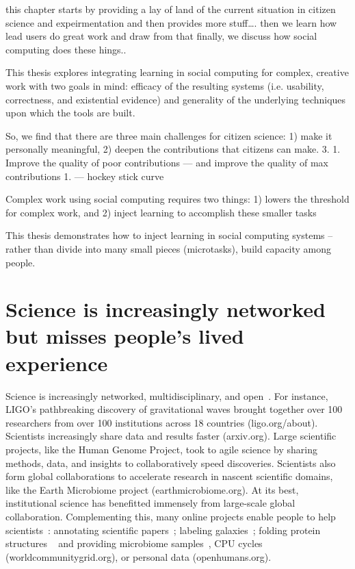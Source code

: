 this chapter starts by providing a lay of land of the current situation in citizen science and expeirmentation and then provides more stuff…. 
then we learn how lead users do great work and draw from that
finally, we discuss how social computing does these hings.. 

 This thesis explores integrating learning in social computing for complex, creative work with two goals in mind: efficacy of the resulting systems (i.e. usability, correctness, and existential evidence) and generality of the underlying techniques upon which the tools are built.

So, we find that there are three main challenges for citizen science: 1) make it personally meaningful, 2) deepen the contributions that citizens can make.
3. 1. Improve the quality of poor contributions — and improve the quality of max contributions 
    1. — hockey stick curve 




Complex work using social computing requires two things:
1) lowers the threshold for complex work, and 
2) inject learning to accomplish these smaller tasks

This thesis demonstrates how to inject learning in social computing systems
-- rather than divide into many small pieces (microtasks), build capacity among people. 


\section{Science is increasingly networked but misses people’s lived experience }
Science is increasingly networked, multidisciplinary, and
open~\cite{Pandey2017}. For instance, LIGO’s pathbreaking discovery of
gravitational waves brought together over 100 researchers
from over 100 institutions across 18 countries (ligo.org/about). 
Scientists increasingly share data and results faster (arxiv.org). 
Large scientific projects, like the Human Genome Project, 
took to agile science by sharing methods, data, and insights to 
collaboratively speed discoveries. Scientists also form global 
collaborations to accelerate research in nascent scientific domains, 
like the Earth Microbiome project (earthmicrobiome.org).
At its best, institutional science has benefitted immensely
from large-scale global collaboration. Complementing this,
many online projects enable people to help scientists~\cite{Nielsen2012}: annotating 
scientific papers~\cite{Good2013}; labeling galaxies~\cite{JordanRaddick2013}; 
folding protein structures ~\cite{Cooper2010} and providing microbiome 
samples~\cite{McDonald2018}, CPU cycles (worldcommunitygrid.org), or 
personal data (openhumans.org). 

